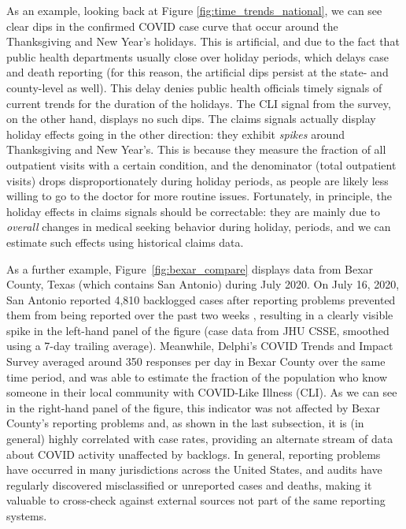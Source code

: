\documentclass[9pt,twocolumn,twoside,lineno]{pnas-new}
\begin{document}
As an example, looking back at Figure \ref{fig:time_trends_national}, we can see
clear dips in the confirmed COVID case curve that occur around the Thanksgiving
and New Year's holidays. This is artificial, and due to the fact that public
health departments usually close over holiday periods, which delays case and
death reporting (for this reason, the artificial dips persist at the state- and
county-level as well). This delay denies public health officials timely signals
of current trends for the duration of the holidays. The CLI signal from the
survey, on the other hand, displays no such dips. The claims signals actually
display holiday effects going in the other direction: they exhibit
\textit{spikes} around Thanksgiving and New Year's. This is because they measure
the fraction of all outpatient visits with a certain condition, and the
denominator (total outpatient visits) drops disproportionately during holiday
periods, as people are likely less willing to go to the doctor for more routine
issues. Fortunately, in principle, the holiday effects in claims signals should
be correctable: they are mainly due to \textit{overall} changes in medical
seeking behavior during holiday, periods, and we can estimate such effects using
historical claims data.

As a further example, Figure~\ref{fig:bexar_compare} displays data from Bexar
County, Texas (which contains San Antonio) during July 2020. On July 16, 2020,
San Antonio reported 4,810 backlogged cases after reporting problems prevented
them from being reported over the past two weeks \cite{Palacios:2021}, resulting
in a clearly visible spike in the left-hand panel of the figure (case data from
JHU CSSE, smoothed using a 7-day trailing average). Meanwhile, Delphi's COVID
Trends and Impact Survey averaged around 350 responses per day in Bexar County
over the same time period, and was able to estimate the fraction of the
population who know someone in their local community with COVID-Like Illness
(CLI). As we can see in the right-hand panel of the figure, this indicator was 
not affected by Bexar County's reporting problems and, as shown in the last 
subsection, it is (in general) highly correlated with case rates, providing an
alternate stream of data about COVID activity unaffected by backlogs. In
general, reporting problems have occurred in many jurisdictions across the
United States, and audits have regularly discovered misclassified or unreported
cases and deaths, making it valuable to cross-check against external sources not
part of the same reporting systems.
\end{document}
